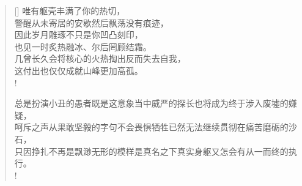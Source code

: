 \documentclass[UTF8, 12pt, a4paper]{ctexrep} %
\begin{document}
\begin{verse}[\versewidth]
唯有躯壳丰满了你的热切，\\
警醒从未寄居的安歇然后飘荡没有痕迹，\\
因此岁月雕琢不只是你凹凸刻印，\\
也见一时炙热融冰、尔后罔顾结霜。\\
几曾长久会将核心的火热掏出反而失去自我，\\
这付出也仅仅成就山峰更加高孤。\\!

总是扮演小丑的愚者既是这意象当中威严的探长也将成为终于涉入废墟的嫌疑，\\
呵斥之声从果敢坚毅的字句不会畏惧牺牲已然无法继续贯彻在痛苦磨砺的沙石，\\
只因挣扎不再是飘渺无形的模样是真名之下真实身躯又怎会有从一而终的执行。\\!

\end{verse}
\end{document}
